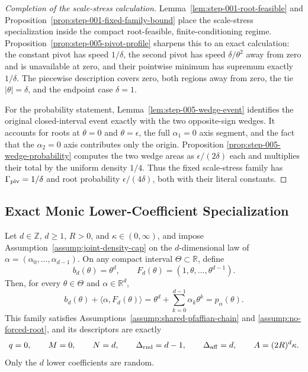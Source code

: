 \begin{proof}[Completion of the scale-stress calculation]
Lemma~\ref{lem:step-001-root-feasible} and
Proposition~\ref{prop:step-001-fixed-family-bound} place the scale-stress
specialization inside the compact root-feasible, finite-conditioning
regime.  Proposition~\ref{prop:step-005-pivot-profile} sharpens this to an
exact calculation: the constant pivot has speed $1/\delta$, the second
pivot has speed $\delta/\theta^2$ away from zero and is unavailable at zero,
and their pointwise minimum has supremum exactly $1/\delta$.  The piecewise
description covers zero, both regions away from zero, the tie
$|\theta|=\delta$, and the endpoint case $\delta=1$.

For the probability statement, Lemma~\ref{lem:step-005-wedge-event}
identifies the original closed-interval event exactly with the two
opposite-sign wedges.  It accounts for roots at $\theta=0$ and
$\theta=\epsilon$, the full $\alpha_1=0$ axis segment, and the fact that the
$\alpha_2=0$ axis contributes only the origin.  Proposition
\ref{prop:step-005-wedge-probability} computes the two wedge areas as
$\epsilon/(2\delta)$ each and multiplies their total by the uniform density
$1/4$.  Thus the fixed scale-stress family has
$\Gamma_{\rm piv}=1/\delta$ and root probability
$\epsilon/(4\delta)$, both with their literal constants.
\end{proof}

\subsection{Exact Monic Lower-Coefficient Specialization}
\label{app:step-006}

\begin{proposition}
\label{prop:step-006-family}
Let $d\in\mathbb Z$, $d\geq1$, $R>0$, and
$\kappa\in(0,\infty)$, and impose
Assumption~\ref{assump:joint-density-cap} on the $d$-dimensional law of
$\alpha=(\alpha_0,\ldots,\alpha_{d-1})$.  On any compact interval
$\Theta\subset\mathbb R$, define
\[
b_d(\theta)=\theta^d,
\qquad
F_d(\theta)=(1,\theta,\ldots,\theta^{d-1}).
\]
Then, for every $\theta\in\Theta$ and $\alpha\in\mathbb R^d$,
\begin{equation}
b_d(\theta)+\langle\alpha,F_d(\theta)\rangle
=\theta^d+\sum_{k=0}^{d-1}\alpha_k\theta^k
=p_\alpha(\theta).
\label{eq:step-006-object-identity}
\end{equation}
This family satisfies Assumptions~\ref{assump:shared-pfaffian-chain} and
\ref{assump:no-forced-root}, and its descriptors are exactly
\begin{equation}
q=0,
\qquad M=0,
\qquad N=d,
\qquad \Delta_{\rm rnd}=d-1,
\qquad \Delta_{\rm aff}=d,
\qquad A=(2R)^d\kappa.
\label{eq:step-006-descriptors}
\end{equation}
Only the $d$ lower coefficients are random.
\end{proposition}

